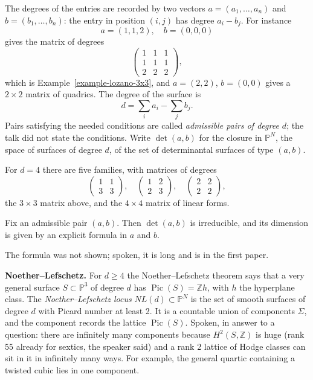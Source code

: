 The degrees of the entries are recorded by
two vectors $a = (a_1,\ldots,a_n)$ and
$b = (b_1,\ldots,b_n)$: the entry in
position $(i,j)$ has degree $a_i - b_j$.
For instance
$$
a = (1,1,2),
\quad
b = (0,0,0)
$$
gives the matrix of degrees
$$
\begin{pmatrix}
1 & 1 & 1 \\
1 & 1 & 1 \\
2 & 2 & 2
\end{pmatrix},
$$
which is Example~\ref{example-lozano-3x3},
and $a = (2,2)$, $b = (0,0)$ gives a
$2 \times 2$ matrix of quadrics. The degree
of the surface is
$$
d = \sum_i a_i - \sum_j b_j.
$$
Pairs satisfying the needed conditions are
called \emph{admissible pairs of degree $d$};
the talk did not state the conditions.
Write $\operatorname{det}(a,b)$ for the
closure in $\mathbb{P}^N$, the space of
surfaces of degree $d$, of the set of
determinantal surfaces of type $(a,b)$.

\begin{example}
\label{example-lozano-five-families}
For $d = 4$ there are five families, with
matrices of degrees
$$
\begin{pmatrix}
1 & 1 \\
3 & 3
\end{pmatrix},
\quad
\begin{pmatrix}
1 & 2 \\
2 & 3
\end{pmatrix},
\quad
\begin{pmatrix}
2 & 2 \\
2 & 2
\end{pmatrix},
$$
the $3 \times 3$ matrix above, and the
$4 \times 4$ matrix of linear forms.
\end{example}

\begin{theorem}
\label{theorem-lvl-irreducible}
Fix an admissible pair $(a,b)$. Then
$\operatorname{det}(a,b)$ is irreducible,
and its dimension is given by an explicit
formula in $a$ and $b$.
\end{theorem}

The formula was not shown; spoken, it is
long and is in the first paper.

\medskip\noindent
{\bf Noether--Lefschetz.} For $d \ge 4$
the Noether--Lefschetz theorem says that a
very general surface $S \subset
\mathbb{P}^3$ of degree $d$ has
$\operatorname{Pic}(S) = \mathbb{Z}h$, with
$h$ the hyperplane class. The
\emph{Noether--Lefschetz locus}
$NL(d) \subset \mathbb{P}^N$ is the set of
smooth surfaces of degree $d$ with Picard
number at least 2. It is a countable union
of components $\Sigma$, and the component
records the lattice $\operatorname{Pic}(S)$.
Spoken, in answer to a question: there are
infinitely many components because
$H^2(S,\mathbb{Z})$ is huge (rank 55 already
for sextics, the speaker said) and a rank 2
lattice of Hodge classes can sit in it in
infinitely many ways. For example, the
general quartic containing a twisted cubic
lies in one component.

